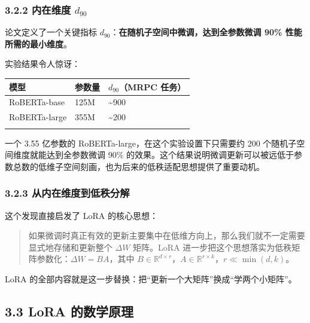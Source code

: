 \documentclass[
  chinese,
]{ctexart}
\begin{document}
\subsubsection{\texorpdfstring{3.2.2 内在维度
\(d_{90}\)}{3.2.2 内在维度 d\_\{90\}}}\label{ux5185ux5728ux7ef4ux5ea6-d_90}

论文定义了一个关键指标
\(d_{90}\)：\textbf{在随机子空间中微调，达到全参数微调 90\%
性能所需的最小维度}。

实验结果令人惊讶：

\begin{center}
\begin{tabular}{@{}>{\raggedright\arraybackslash}p{} >{\raggedright\arraybackslash}p{} >{\raggedright\arraybackslash}p{}@{}}
\toprule\noalign{}
模型 & 参数量 & \(d_{90}\)（MRPC 任务） \\
\midrule\noalign{}
RoBERTa-base & 125M & \textasciitilde900 \\
RoBERTa-large & 355M & \textasciitilde200 \\
\bottomrule\noalign{}
\end{tabular}
\end{center}

一个 3.55 亿参数的 RoBERTa-large，在这个实验设置下只需要约 200
个随机子空间维度就能达到全参数微调 90\%
的效果。这个结果说明微调更新可以被远低于参数总数的低维子空间刻画，也为后来的低秩适配思想提供了重要动机。

\subsubsection{3.2.3
从内在维度到低秩分解}\label{ux4eceux5185ux5728ux7ef4ux5ea6ux5230ux4f4eux79e9ux5206ux89e3}

这个发现直接启发了 LoRA 的核心思想：

\begin{quote}
如果微调时真正有效的更新主要集中在低维方向上，那么我们就不一定需要显式地存储和更新整个
\(\Delta W\) 矩阵。LoRA
进一步把这个思想落实为低秩矩阵参数化：\(\Delta W = BA\)，其中
\(B \in \mathbb{R}^{d \times r}\)，\(A \in \mathbb{R}^{r \times k}\)，\(r \ll \min(d, k)\)。
\end{quote}

LoRA
的全部内容就是这一步替换：把``更新一个大矩阵''换成``学两个小矩阵''。

\subsection{3.3 LoRA
的数学原理}\label{lora-ux7684ux6570ux5b66ux539fux7406}
\end{document}
